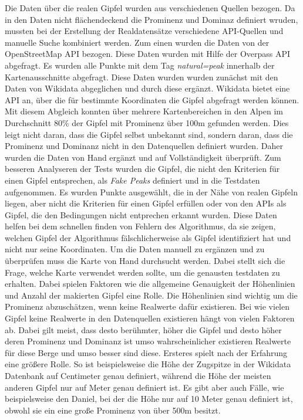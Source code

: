 Die Daten über die realen Gipfel wurden aus verschiedenen Quellen bezogen. Da in den Daten nicht flächendeckend  die Prominenz und Dominaz definiert wruden, mussten bei der Erstellung der Realdatensätze verschiedene API-Quellen und manuelle Suche kombiniert werden. Zum einen wurden die Daten von der OpenStreetMap API bezogen. Diese Daten wurden mit Hilfe der Overpass API abgefragt. Es wurden alle Punkte mit dem Tag \textit{natural=peak} innerhalb der Kartenausschnitte abgefragt. Diese Daten wurden wurden zunächst mit den Daten von Wikidata abgeglichen und durch diese ergänzt. Wikidata bietet eine API an, über die für bestimmte Koordinaten die Gipfel abgefragt werden können. Mit diesem Abgleich konnten über mehrere Kartenbereichen in den Alpen im Durchschnitt 80\% der Gipfel mit Prominenz über 100m gefunden werden. Dies leigt nicht daran, dass die Gipfel selbst unbekannt sind, sondern daran, dass die Prominenz und Dominanz nicht in den Datenquellen definiert wurden. Daher wurden die Daten von Hand ergänzt und auf Vollständigkeit überprüft. Zum besseren Analyseren der Tests wurden die Gipfel, die nicht den Kriterien für einen Gipfel entsprechen, als \textit{Fake Peaks} definiert und in die Testdaten aufgenommen. Es wurden Punkte ausgewählt, die in der Nähe von realen Gipfeln liegen, aber nicht die Kriterien für einen Gipfel erfüllen oder von den APIs als Gipfel, die den Bedingungen nicht entprechen erkannt wurden. Diese Daten helfen bei dem schnellen finden von Fehlern des Algorithmus, da sie zeigen, welchen Gipfel der Algorithmus fälschlicherweise als Gipfel identifiziert hat und nicht nur seine Koordinaten.
Um die Daten manuell zu ergänzen und zu überprüfen muss die Karte von Hand durchsucht werden. Dabei stellt sich die Frage, welche Karte verwendet werden sollte, um die genausten testdaten zu erhalten. Dabei spielen Faktoren wie die allgemeine Genauigkeit der Höhenlinien und Anzahl der makierten Gipfel eine Rolle. Die Höhenlinien sind wichtig um die Prominenz abzuschätzen, wenn keine Realwerte dafür existieren. Bei wie vielen Gipfel keine Realwerte in den Datenquellen existieren hängt von vielen Faktoren ab. Dabei gilt meist, dass desto berühmter, höher die Gipfel und desto höher deren Prominenz und Dominanz ist umso wahrscheinlicher existieren Realwerte für diese Berge und umso besser sind diese. Ersteres spielt nach der Erfahrung eine größere Rolle. So ist beispielsweise die Höhe der Zugspitze in der Wikidata Datenbank auf Centimeter genau definiert, während die Höhe der meisten anderen Gipfel nur auf Meter genau definiert ist. Es gibt aber auch Fälle, wie beispielsweise den Daniel, bei der die Höhe nur auf 10 Meter genau definiert ist, obwohl sie ein eine große Prominenz von über 500m besitzt.


